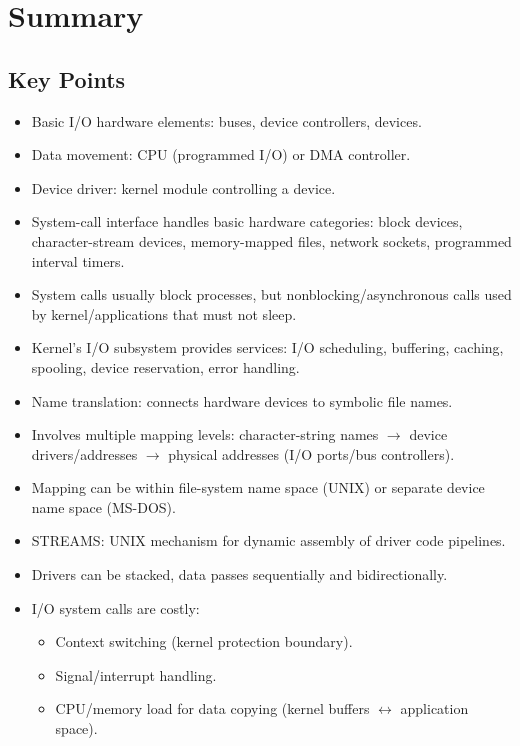 \section{Summary}

\subsection{Key Points}
\begin{itemize}
    \item Basic I/O hardware elements: buses, device controllers, devices.
    \item Data movement: CPU (programmed I/O) or DMA controller.
    \item Device driver: kernel module controlling a device.
    \item System-call interface handles basic hardware categories: block devices, character-stream devices, memory-mapped files, network sockets, programmed interval timers.
    \item System calls usually block processes, but nonblocking/asynchronous calls used by kernel/applications that must not sleep.
    \item Kernel's I/O subsystem provides services: I/O scheduling, buffering, caching, spooling, device reservation, error handling.
    \item Name translation: connects hardware devices to symbolic file names.
    \item Involves multiple mapping levels: character-string names $\rightarrow$ device drivers/addresses $\rightarrow$ physical addresses (I/O ports/bus controllers).
    \item Mapping can be within file-system name space (UNIX) or separate device name space (MS-DOS).
    \item STREAMS: UNIX mechanism for dynamic assembly of driver code pipelines.
    \item Drivers can be stacked, data passes sequentially and bidirectionally.
    \item I/O system calls are costly:
    \begin{itemize}
        \item Context switching (kernel protection boundary).
        \item Signal/interrupt handling.
        \item CPU/memory load for data copying (kernel buffers $\leftrightarrow$ application space).
    \end{itemize}
\end{itemize}
